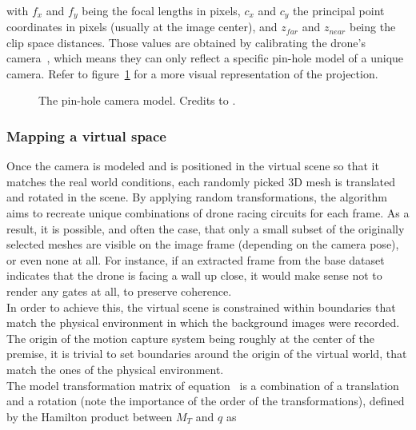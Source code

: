 ~\\with $f_x$ and $f_y$ being the focal lengths in pixels, $c_x$ and $c_y$ the
principal point coordinates in pixels (usually at the image center), and
$z_{far}$ and $z_{near}$ being the clip space distances. Those values are
obtained by calibrating the drone's camera~\cite{OpenCVCalibration}, which
means they can only reflect a specific pin-hole model of a unique camera. Refer
to figure~\ref{fig:pinholemodel} for a more visual representation of the
projection.

\begin{figure}[h]
	\center
	\resizebox{300pt}{!}{
		
	}
	\caption[Pin-hole camera model]{The pin-hole camera model. Credits to
	\cite{cfr}.}
	\label{fig:pinholemodel}
\end{figure}


	\subsubsection{Mapping a virtual space}

Once the camera is modeled and is positioned in the virtual scene so
that it matches the real world conditions, each randomly picked 3D mesh is
translated and rotated in the scene. By applying random transformations, the
algorithm aims to recreate unique combinations of drone racing circuits for
each frame. As a result, it is possible, and often the case, that only a small
subset of the originally selected meshes are visible on the image frame
(depending on the camera pose), or even none at all. For instance, if an
extracted frame from the base dataset indicates that the drone is facing a wall
up close, it would make sense not to render any gates at all, to preserve
coherence.\\

In order to achieve this, the virtual scene is constrained within boundaries
that match the physical environment in which the background images were
recorded. The origin of the motion capture system being roughly at the center
of the premise, it is trivial to set boundaries around the origin of the
virtual world, that match the ones of the physical environment.\\

The model transformation matrix of equation~ is a
combination of a translation and a rotation (note the importance of the order
of the transformations), defined by the Hamilton product between $M_T$ and $q$
as

